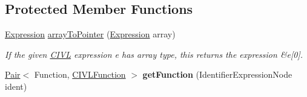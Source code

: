 \subsection*{Protected Member Functions}
\begin{DoxyCompactItemize}
\item 
\hyperlink{interfaceedu_1_1udel_1_1cis_1_1vsl_1_1civl_1_1model_1_1IF_1_1expression_1_1Expression}{Expression} \hyperlink{classedu_1_1udel_1_1cis_1_1vsl_1_1civl_1_1model_1_1common_1_1FunctionTranslator_a31010823e5438cc39a303b53320bf09f}{array\+To\+Pointer} (\hyperlink{interfaceedu_1_1udel_1_1cis_1_1vsl_1_1civl_1_1model_1_1IF_1_1expression_1_1Expression}{Expression} array)
\begin{DoxyCompactList}\small\item\em If the given \hyperlink{classedu_1_1udel_1_1cis_1_1vsl_1_1civl_1_1CIVL}{C\+I\+V\+L} expression e has array type, this returns the expression \&e\mbox{[}0\mbox{]}. \end{DoxyCompactList}\item 
\hypertarget{classedu_1_1udel_1_1cis_1_1vsl_1_1civl_1_1model_1_1common_1_1FunctionTranslator_a39d87c6833a134db46815caaaa59090b}{}\hyperlink{classedu_1_1udel_1_1cis_1_1vsl_1_1civl_1_1util_1_1IF_1_1Pair}{Pair}$<$ Function, \hyperlink{interfaceedu_1_1udel_1_1cis_1_1vsl_1_1civl_1_1model_1_1IF_1_1CIVLFunction}{C\+I\+V\+L\+Function} $>$ {\bfseries get\+Function} (Identifier\+Expression\+Node ident)\label{classedu_1_1udel_1_1cis_1_1vsl_1_1civl_1_1model_1_1common_1_1FunctionTranslator_a39d87c6833a134db46815caaaa59090b}


\end{DoxyCompactItemize}
